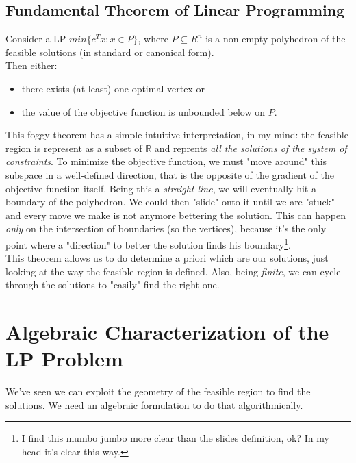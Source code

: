             \subsection{Fundamental Theorem of Linear Programming}
            \begin{theorem}
                Consider a LP $min\{c^T x : x \in P\}$, where $P \subseteq R^n$ is a non-empty polyhedron of the feasible solutions (in standard or canonical form).\\
                Then either:
                \begin{itemize}
                    \item  there exists (at least) one optimal vertex or
                    \item the value of the objective function is unbounded below on $P$.
                \end{itemize}
               
            \end{theorem}
            This foggy theorem has a simple intuitive interpretation, in my mind: the feasible region is represent as a subset of $\mathbb{R}$ and reprents \textit{all the solutions of the system of constraints}. To minimize the objective function, we must "move around" this subspace in a well-defined direction, that is the opposite of the gradient of the objective function itself. Being this a \textit{straight line}, we will eventually hit a boundary of the polyhedron. We could then "slide" onto it until we are "stuck" and every move we make is not anymore bettering the solution. This can happen \textit{only} on the intersection of boundaries (so the vertices), because it's the only point where a "direction" to better the solution finds his boundary\footnote{I find this mumbo jumbo more clear than the slides definition, ok? In my head it's clear this way.}.\\
            This theorem allows us to do determine a priori which are our solutions, just looking at the way the feasible region is defined. Also, being \textit{finite}, we can cycle through the solutions to "easily" find the right one.

    \section{Algebraic Characterization of the LP Problem}
        We've seen we can exploit the geometry of the feasible region to find the solutions. We need an algebraic formulation to do that algorithmically.


